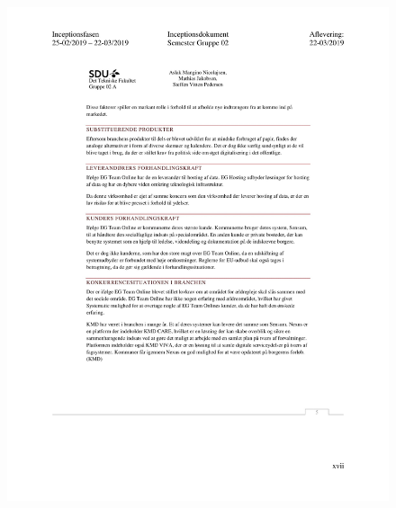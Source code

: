 \begin{figure}[hb]
  \includegraphics[scale = 0.33]{./PNG/Inceptions/Gruppe 02 + InceptionsDokument-50.jpg} 
\end{figure}

